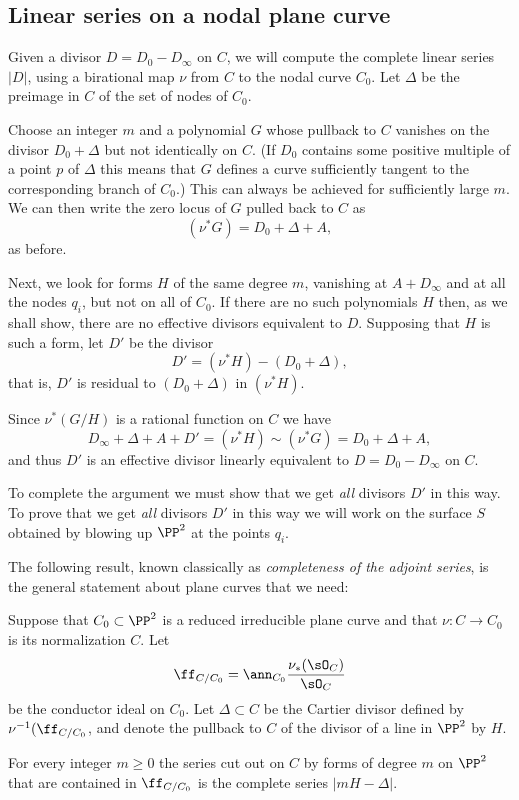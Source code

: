 
\subsection{Linear series on a nodal plane curve}\label{linear series on nodal plane curves}

Given a divisor $D = D_{0}-D_{\infty}$ on $C$, we will compute the complete linear series $|D|$, using a birational map $\nu$ from 
$C$ to the nodal curve $C_0$. Let $\Delta$ be the preimage in $C$ of the set of nodes of $C_{0}$.

Choose an integer $m$ and a polynomial $G$ whose pullback to $C$
  vanishes on the divisor $D_0+\Delta$ 
 but not identically on $C$. (If $D_0$ contains some positive multiple of a point $p$ of $\Delta$ this means that $G$ defines
 a curve sufficiently tangent to the corresponding branch of $C_0$.) This can always be achieved for
 sufficiently large $m$. We can then write the zero locus of $G$ pulled back to $C$ as
$$
(\nu^*G) = D_0 + \Delta + A,
$$
as before. 


Next, we look for forms $H$ of the same degree $m$, vanishing at $A+D_\infty$ and at all the nodes $q_i$,  but not on all of $C_0$. If there are no such polynomials $H$ then, as we shall show,
there are no effective divisors equivalent to $D$. Supposing that $H$ is such a form, let $D'$ be the divisor 
$$
D' = (\nu^*H) -( D_0 + \Delta),
$$
that is, $D'$ is residual to $( D_0 + \Delta)$ in $(\nu^*H)$. 

Since $\nu^*(G/H)$ is a rational function on $C$ we have
$$
D_\infty +\Delta + A+ D' = (\nu^*H) \sim (\nu^*G) = D_0 + \Delta + A,
$$
and thus $D'$ is an effective divisor linearly equivalent to $D = D_{0}-D_{\infty}$ on $C$.

To complete the argument we must show that we get \emph{all} divisors $D'$ in this way.
To prove that we get \emph{all} divisors $D'$ in this way we will work on the surface $S$ obtained by blowing up
$\PP^2$ at the points $q_i$. 

The following result, known classically as \emph{completeness of the adjoint series}, is the general
statement about plane curves that we need:

\begin{theorem}\label{conductor completeness}
Suppose that $C_0 \subset \PP^2$ is a reduced irreducible plane curve and that $\nu : C \to C_0$ is its normalization $C$. Let 
$$
\ff_{C/C_{0}} = \ann_{C_{0}} \frac{\nu_{*}(\sO_C)}{\sO_{C}}
$$
be the conductor ideal on $C_{0}$. Let $\Delta\subset C$ be the Cartier divisor
defined by $\nu^{-1}(\ff_{C/C_{0}}$, and denote the pullback to $C$ of the divisor of a line
in $\PP^{2}$ by $H$.

For every integer $m\geq 0$ the series cut out on $C$ by forms of degree $m$
on $\PP^{2}$ that are contained in $\ff_{C/C_{0}}$ is the complete series
$|mH-\Delta|.$
\end{theorem}

